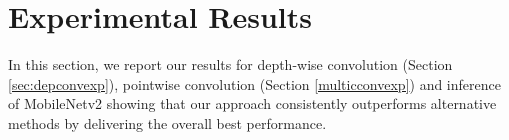 \section{Experimental Results}
\label{exp} In this section, we report our results for depth-wise convolution (Section \ref{sec:depconvexp}), pointwise convolution (Section \ref {multicconvexp}) and inference of MobileNetv2 showing that our approach consistently outperforms alternative methods by delivering the overall best performance.


%
%
%
%
%
